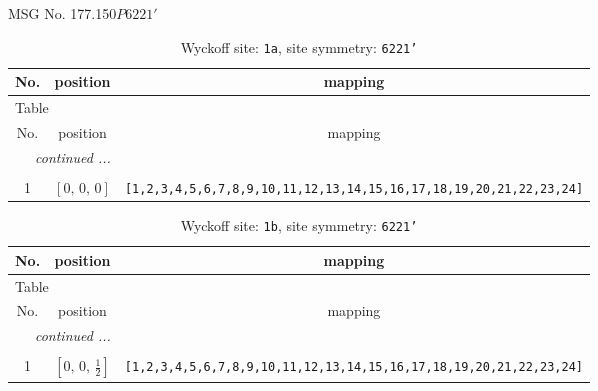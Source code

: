 \documentclass[fleqn,8pt]{jsarticle}
\begin{document}
\setcounter{MaxMatrixCols}{32}

\renewcommand{\tablename}{Table~}
\renewcommand{\figurename}{Figure~}
\begin{center}
\LARGE
MSG No. 177.150\quad$P6221'$
\end{center}
\renewcommand{\arraystretch}{1.2}
\begin{longtable}{ccc}
\caption{Wyckoff site: {\tt 1a}, site symmetry: {\tt 6221'}}
 \\
 \hline \hline
No. & position & mapping \\ \hline \endfirsthead

\multicolumn{2}{l}{\tablename\ \thetable{}} \\
 \hline \hline
No. & position & mapping \\ \hline \endhead

 \hline \hline
\multicolumn{2}{r}{\footnotesize\it continued ...} \\ \endfoot

 \hline \hline
\multicolumn{2}{r}{} \\ \endlastfoot

1 & $\left[ 0,\, 0,\, 0 \right]$ & {\tt [1,2,3,4,5,6,7,8,9,10,11,12,13,14,15,16,17,18,19,20,21,22,23,24]} \\
\end{longtable}
\renewcommand{\arraystretch}{1.2}
\begin{longtable}{ccc}
\caption{Wyckoff site: {\tt 1b}, site symmetry: {\tt 6221'}}
 \\
 \hline \hline
No. & position & mapping \\ \hline \endfirsthead

\multicolumn{2}{l}{\tablename\ \thetable{}} \\
 \hline \hline
No. & position & mapping \\ \hline \endhead

 \hline \hline
\multicolumn{2}{r}{\footnotesize\it continued ...} \\ \endfoot

 \hline \hline
\multicolumn{2}{r}{} \\ \endlastfoot

1 & $\left[ 0,\, 0,\, \frac{1}{2} \right]$ & {\tt [1,2,3,4,5,6,7,8,9,10,11,12,13,14,15,16,17,18,19,20,21,22,23,24]} \\
\end{longtable}
\renewcommand{\arraystretch}{1.2}
\end{document}
